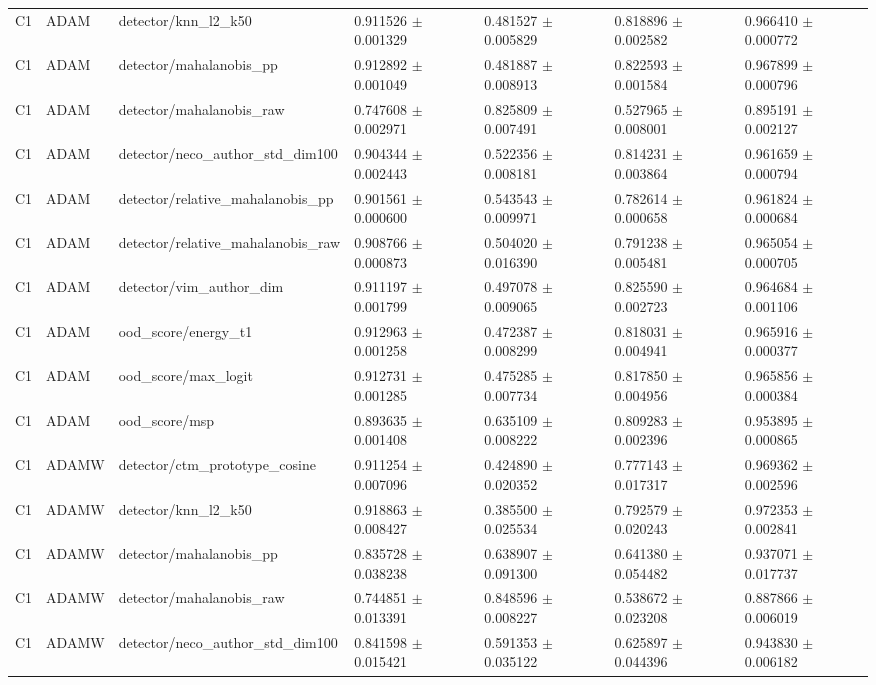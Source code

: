 \begin{longtable}{lllllll}
C1 & ADAM & detector/knn\_l2\_k50 & 0.911526 $\pm$ 0.001329 & 0.481527 $\pm$ 0.005829 & 0.818896 $\pm$ 0.002582 & 0.966410 $\pm$ 0.000772 \\
C1 & ADAM & detector/mahalanobis\_pp & 0.912892 $\pm$ 0.001049 & 0.481887 $\pm$ 0.008913 & 0.822593 $\pm$ 0.001584 & 0.967899 $\pm$ 0.000796 \\
C1 & ADAM & detector/mahalanobis\_raw & 0.747608 $\pm$ 0.002971 & 0.825809 $\pm$ 0.007491 & 0.527965 $\pm$ 0.008001 & 0.895191 $\pm$ 0.002127 \\
C1 & ADAM & detector/neco\_author\_std\_dim100 & 0.904344 $\pm$ 0.002443 & 0.522356 $\pm$ 0.008181 & 0.814231 $\pm$ 0.003864 & 0.961659 $\pm$ 0.000794 \\
C1 & ADAM & detector/relative\_mahalanobis\_pp & 0.901561 $\pm$ 0.000600 & 0.543543 $\pm$ 0.009971 & 0.782614 $\pm$ 0.000658 & 0.961824 $\pm$ 0.000684 \\
C1 & ADAM & detector/relative\_mahalanobis\_raw & 0.908766 $\pm$ 0.000873 & 0.504020 $\pm$ 0.016390 & 0.791238 $\pm$ 0.005481 & 0.965054 $\pm$ 0.000705 \\
C1 & ADAM & detector/vim\_author\_dim & 0.911197 $\pm$ 0.001799 & 0.497078 $\pm$ 0.009065 & 0.825590 $\pm$ 0.002723 & 0.964684 $\pm$ 0.001106 \\
C1 & ADAM & ood\_score/energy\_t1 & 0.912963 $\pm$ 0.001258 & 0.472387 $\pm$ 0.008299 & 0.818031 $\pm$ 0.004941 & 0.965916 $\pm$ 0.000377 \\
C1 & ADAM & ood\_score/max\_logit & 0.912731 $\pm$ 0.001285 & 0.475285 $\pm$ 0.007734 & 0.817850 $\pm$ 0.004956 & 0.965856 $\pm$ 0.000384 \\
C1 & ADAM & ood\_score/msp & 0.893635 $\pm$ 0.001408 & 0.635109 $\pm$ 0.008222 & 0.809283 $\pm$ 0.002396 & 0.953895 $\pm$ 0.000865 \\
C1 & ADAMW & detector/ctm\_prototype\_cosine & 0.911254 $\pm$ 0.007096 & 0.424890 $\pm$ 0.020352 & 0.777143 $\pm$ 0.017317 & 0.969362 $\pm$ 0.002596 \\
C1 & ADAMW & detector/knn\_l2\_k50 & 0.918863 $\pm$ 0.008427 & 0.385500 $\pm$ 0.025534 & 0.792579 $\pm$ 0.020243 & 0.972353 $\pm$ 0.002841 \\
C1 & ADAMW & detector/mahalanobis\_pp & 0.835728 $\pm$ 0.038238 & 0.638907 $\pm$ 0.091300 & 0.641380 $\pm$ 0.054482 & 0.937071 $\pm$ 0.017737 \\
C1 & ADAMW & detector/mahalanobis\_raw & 0.744851 $\pm$ 0.013391 & 0.848596 $\pm$ 0.008227 & 0.538672 $\pm$ 0.023208 & 0.887866 $\pm$ 0.006019 \\
C1 & ADAMW & detector/neco\_author\_std\_dim100 & 0.841598 $\pm$ 0.015421 & 0.591353 $\pm$ 0.035122 & 0.625897 $\pm$ 0.044396 & 0.943830 $\pm$ 0.006182 \\

\end{longtable}
